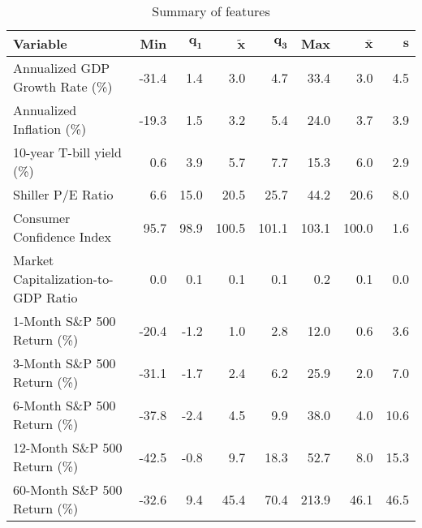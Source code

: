 \begin{table}[ht]
\centering
\begingroup\normalsize
\begin{tabular}{lrrrrrrr}
 \textbf{Variable} & \textbf{Min} & $\mathbf{q_1}$ & $\mathbf{\widetilde{x}}$ & $\mathbf{q_3}$ & \textbf{Max} & $\mathbf{\bar{x}}$ & $\mathbf{s}$ \\ 
  \hline
Annualized GDP Growth Rate (\%) & -31.4 &  1.4 &   3.0 &   4.7 &  33.4 &   3.0 &  4.5 \\ 
  Annualized Inflation (\%) & -19.3 &  1.5 &   3.2 &   5.4 &  24.0 &   3.7 &  3.9 \\ 
  10-year T-bill yield (\%) &   0.6 &  3.9 &   5.7 &   7.7 &  15.3 &   6.0 &  2.9 \\ 
  Shiller P/E Ratio &   6.6 & 15.0 &  20.5 &  25.7 &  44.2 &  20.6 &  8.0 \\ 
  Consumer Confidence Index &  95.7 & 98.9 & 100.5 & 101.1 & 103.1 & 100.0 &  1.6 \\ 
  Market Capitalization-to-GDP Ratio &   0.0 &  0.1 &   0.1 &   0.1 &   0.2 &   0.1 &  0.0 \\ 
  1-Month S\&P 500 Return (\%) & -20.4 & -1.2 &   1.0 &   2.8 &  12.0 &   0.6 &  3.6 \\ 
  3-Month S\&P 500 Return (\%) & -31.1 & -1.7 &   2.4 &   6.2 &  25.9 &   2.0 &  7.0 \\ 
  6-Month S\&P 500 Return (\%) & -37.8 & -2.4 &   4.5 &   9.9 &  38.0 &   4.0 & 10.6 \\ 
  12-Month S\&P 500 Return (\%) & -42.5 & -0.8 &   9.7 &  18.3 &  52.7 &   8.0 & 15.3 \\ 
  60-Month S\&P 500 Return (\%) & -32.6 &  9.4 &  45.4 &  70.4 & 213.9 &  46.1 & 46.5 \\ 
  \end{tabular}
\endgroup
\caption{Summary of features} 
\label{tab:features}
\end{table}
